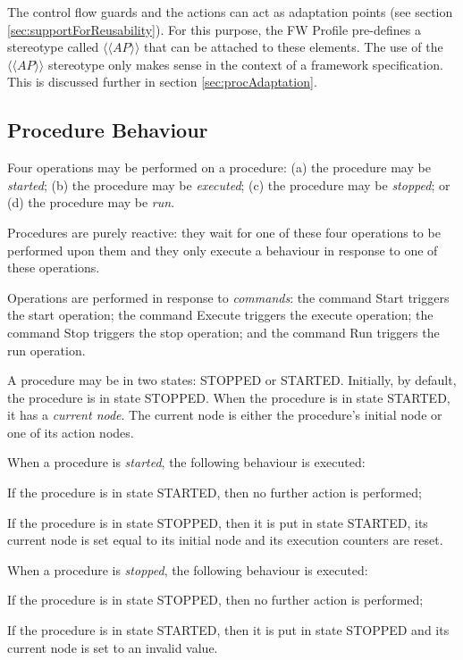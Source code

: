 \documentclass[a4paper,10pt]{article}
\newenvironment{fw_enumerate}					%
{\begin{enumerate}
  \setlength{\itemsep}{1mm}
  \setlength{\parskip}{0pt}
  \setlength{\parsep}{0pt}}
{\end{enumerate}}
\begin{document}
The control flow guards and the actions can act as adaptation points (see section \ref{sec:supportForReusability}). For this
purpose, the FW Profile pre-defines a stereotype called $\langle\langle AP \rangle\rangle$ that can be attached to these
elements. The use of the $\langle\langle AP \rangle\rangle$ stereotype only makes sense in the context of a framework
specification. This is discussed further in section \ref{sec:procAdaptation}.

\subsection{Procedure Behaviour}\label{sec:procBehaviour} 
Four operations may be performed on a procedure: (a) the procedure may be \emph{started}; (b) the
procedure may be \emph{executed}; (c) the procedure may be \emph{stopped}; or (d) the procedure may be
\emph{run}.

Procedures are purely reactive: they wait for one of these four operations to be performed upon
them and they only execute a behaviour in response to one of these operations.

Operations are performed in response to \emph{commands}: the command Start triggers the start
operation; the command Execute triggers the execute operation; the command Stop triggers the
stop operation; and the command Run triggers the run operation.

A procedure may be in two states: STOPPED or STARTED. Initially, by default, the procedure
is in state STOPPED. When the procedure is in state STARTED, it has a \emph{current node}. The
current node is either the procedure's initial node or one of its action nodes.

When a procedure is \emph{started}, the following behaviour is executed:
\begin{fw_enumerate} 
\item If the procedure is in state STARTED, then no further action is performed;
\item If the procedure is in state STOPPED, then it is put in state STARTED, its current
node is set equal to its initial node and its execution counters are reset.
\end{fw_enumerate}

When a procedure is \emph{stopped}, the following behaviour is executed:

\begin{fw_enumerate} 
\item If the procedure is in state STOPPED, then no further action is performed;
\item If the procedure is in state STARTED, then it is put in state STOPPED and its current
node is set to an invalid value.
\end{fw_enumerate}
\end{document}
